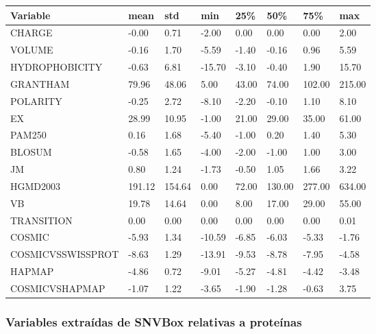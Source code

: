 \begin{table}[H]
\begin{tabular}{|l|l|l|l|l|l|l|l|}
\hline
Variable & mean   & std    & min    & 25\%  & 50\%   & 75\%   & max    \\ \hline
CHARGE            & -0.00  & 0.71   & -2.00  & 0.00  & 0.00   & 0.00   & 2.00   \\ \hline
VOLUME            & -0.16  & 1.70   & -5.59  & -1.40 & -0.16  & 0.96   & 5.59   \\ \hline
HYDROPHOBICITY    & -0.63  & 6.81   & -15.70 & -3.10 & -0.40  & 1.90   & 15.70  \\ \hline
GRANTHAM          & 79.96  & 48.06  & 5.00   & 43.00 & 74.00  & 102.00 & 215.00 \\ \hline
POLARITY          & -0.25  & 2.72   & -8.10  & -2.20 & -0.10  & 1.10   & 8.10   \\ \hline
EX                & 28.99  & 10.95  & -1.00  & 21.00 & 29.00  & 35.00  & 61.00  \\ \hline
PAM250            & 0.16   & 1.68   & -5.40  & -1.00 & 0.20   & 1.40   & 5.30   \\ \hline
BLOSUM            & -0.58  & 1.65   & -4.00  & -2.00 & -1.00  & 1.00   & 3.00   \\ \hline
JM                & 0.80   & 1.24   & -1.73  & -0.50 & 1.05   & 1.66   & 3.22   \\ \hline
HGMD2003          & 191.12 & 154.64 & 0.00   & 72.00 & 130.00 & 277.00 & 634.00 \\ \hline
VB                & 19.78  & 14.64  & 0.00   & 8.00  & 17.00  & 29.00  & 55.00  \\ \hline
TRANSITION        & 0.00   & 0.00   & 0.00   & 0.00  & 0.00   & 0.00   & 0.01   \\ \hline
COSMIC            & -5.93  & 1.34   & -10.59 & -6.85 & -6.03  & -5.33  & -1.76  \\ \hline
COSMICVSSWISSPROT & -8.63  & 1.29   & -13.91 & -9.53 & -8.78  & -7.95  & -4.58  \\ \hline
HAPMAP            & -4.86  & 0.72   & -9.01  & -5.27 & -4.81  & -4.42  & -3.48  \\ \hline
COSMICVSHAPMAP    & -1.07  & 1.22   & -3.65  & -1.90 & -1.28  & -0.63  & 3.75   \\ \hline
\end{tabular}
\end{table}

\subsubsection{Variables extraídas de SNVBox relativas a proteínas}

